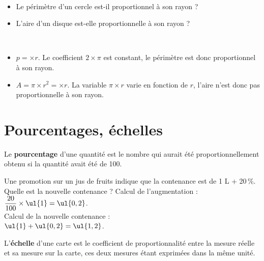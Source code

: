\begin{exemple}
\ \\ [-10mm]
   \begin{itemize}
      \item Le périmètre d'un cercle est-il proportionnel à son rayon ?
      \item L'aire d'un disque est-elle proportionnelle à son rayon ?
   \end{itemize}
   \correction
    \ \\ [-10mm]
       \begin{itemize}
         \item $p =$\fbox{$2\times\pi$}$\times r$. Le coefficient $2\times\pi$ est constant, le périmètre est donc proportionnel à son rayon.
         \item  $A =\pi\times r^2 =$$\times r$. La variable $\pi\times r$ varie en fonction de $r$, l'aire n'est donc pas proportionnelle à son rayon.
      \end{itemize}
  \end{exemple}

\section{Pourcentages, échelles}

\begin{definition}
   Le {\bf pourcentage} d'une quantité est le nombre qui aurait été proportionnellement obtenu si la quantité avait été de 100.
\end{definition}

\begin{exemple}
   Une promotion sur un jus de fruits indique que la contenance est de 1 L + 20\,\%. \\
      Quelle est la nouvelle contenance ?
   \correction
      Calcul de l'augmentation : $\dfrac{20}{100}\times\ul{1} =\ul{0,2}$. \\
      Calcul de la nouvelle contenance : \\
      $\ul{1}+\ul{0,2} =\ul{1,2}$.
\end{exemple}

\medskip

\begin{definition}
   L'\textbf{échelle} d'une carte est le coefficient de proportionnalité entre la mesure réelle et sa mesure sur la carte, ces deux mesures étant exprimées dans la même unité.
\end{definition}

